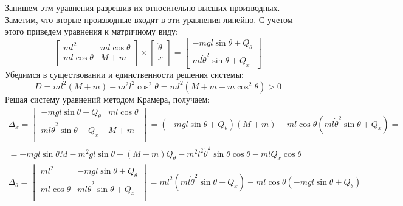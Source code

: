 Запишем этм уравнения разрешив их относительно высших производных. Заметим, что вторые производные 
входят в эти уравнения линейно. С учетом этого приведем уравнения к матричному виду:  %
\begin{equation}
    \begin{bmatrix}
        ml^2 & ml\cos\theta \\
        ml\cos\theta & M + m \\
    \end{bmatrix} \times
    \begin{bmatrix}
        \ddot{\theta} \\
        \ddot{x} \\
    \end{bmatrix} =
    \begin{bmatrix}
        -mgl\sin\theta + Q_{\theta} \\
        ml\dot{\theta}^2\sin\theta + Q_x
    \end{bmatrix}
\end{equation}
Убедимся в существовании и единственности решения системы:
\begin{equation}
    D = ml^2(M + m) - m^2l^2\cos^2\theta = ml^2(M + m - m\cos^2\theta) > 0
\end{equation}
Решая систему уравнений методом Крамера, получаем:
\begin{multline}
    \Delta_{\ddot{x}} = \begin{vmatrix}
        -mgl\sin\theta + Q_{\theta} & ml\cos\theta \\
        ml\dot{\theta}^2\sin\theta + Q_x & M + m \\
    \end{vmatrix} = (-mgl\sin\theta + Q_{\theta})(M + m) - ml\cos\theta(ml\dot{\theta}^2\sin\theta + Q_x) = \\
    = -mgl\sin\theta M - m^2gl\sin\theta + (M + m)Q_{\theta} - m^2l^2\dot{\theta}^2\sin\theta\cos\theta - mlQ_x\cos\theta
\end{multline}
\begin{multline}
    \Delta_{\ddot{\theta}} = \begin{vmatrix}
        ml^2 & -mgl\sin\theta + Q_{\theta} \\
        ml\cos\theta & ml\dot{\theta}^2\sin\theta + Q_x \\
    \end{vmatrix} = ml^2(ml\dot{\theta}^2\sin\theta + Q_x) - ml\cos\theta(-mgl\sin\theta + Q_{\theta})
\end{multline}


